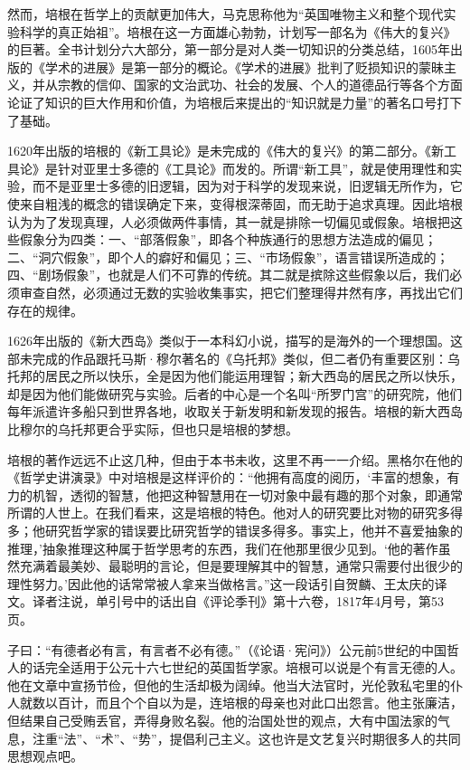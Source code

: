 \par 然而，培根在哲学上的贡献更加伟大，马克思称他为“英国唯物主义和整个现代实验科学的真正始祖”。培根在这一方面雄心勃勃，计划写一部名为《伟大的复兴》的巨著。全书计划分六大部分，第一部分是对人类一切知识的分类总结，1605年出版的《学术的进展》是第一部分的概论。《学术的进展》批判了贬损知识的蒙昧主义，并从宗教的信仰、国家的文治武功、社会的发展、个人的道德品行等各个方面论证了知识的巨大作用和价值，为培根后来提出的“知识就是力量”的著名口号打下了基础。
\par 1620年出版的培根的《新工具论》是未完成的《伟大的复兴》的第二部分。《新工具论》是针对亚里士多德的《工具论》而发的。所谓“新工具”，就是使用理性和实验，而不是亚里士多德的旧逻辑，因为对于科学的发现来说，旧逻辑无所作为，它使来自粗浅的概念的错误确定下来，变得根深蒂固，而无助于追求真理。因此培根认为为了发现真理，人必须做两件事情，其一就是排除一切偏见或假象。培根把这些假象分为四类：一、“部落假象”，即各个种族通行的思想方法造成的偏见；二、“洞穴假象”，即个人的癖好和偏见；三、“市场假象”，语言错误所造成的；四、“剧场假象”，也就是人们不可靠的传统。其二就是摈除这些假象以后，我们必须审查自然，必须通过无数的实验收集事实，把它们整理得井然有序，再找出它们存在的规律。
\par 1626年出版的《新大西岛》类似于一本科幻小说，描写的是海外的一个理想国。这部未完成的作品跟托马斯·穆尔著名的《乌托邦》类似，但二者仍有重要区别：乌托邦的居民之所以快乐，全是因为他们能运用理智；新大西岛的居民之所以快乐，却是因为他们能做研究与实验。后者的中心是一个名叫“所罗门宫”的研究院，他们每年派遣许多船只到世界各地，收取关于新发明和新发现的报告。培根的新大西岛比穆尔的乌托邦更合乎实际，但也只是培根的梦想。
\par 培根的著作远远不止这几种，但由于本书未收，这里不再一一介绍。黑格尔在他的《哲学史讲演录》中对培根是这样评价的：“他拥有高度的阅历，‘丰富的想象，有力的机智，透彻的智慧，他把这种智慧用在一切对象中最有趣的那个对象，即通常所谓的人世上。在我们看来，这是培根的特色。他对人的研究要比对物的研究多得多；他研究哲学家的错误要比研究哲学的错误多得多。事实上，他并不喜爱抽象的推理，’抽象推理这种属于哲学思考的东西，我们在他那里很少见到。‘他的著作虽然充满着最美妙、最聪明的言论，但是要理解其中的智慧，通常只需要付出很少的理性努力。’因此他的话常常被人拿来当做格言。”这一段话引自贺麟、王太庆的译文。译者注说，单引号中的话出自《评论季刊》第十六卷，1817年4月号，第53页。
\par 子曰：“有德者必有言，有言者不必有德。”（《论语·宪问》）公元前5世纪的中国哲人的话完全适用于公元十六七世纪的英国哲学家。培根可以说是个有言无德的人。他在文章中宣扬节俭，但他的生活却极为阔绰。他当大法官时，光伦敦私宅里的仆人就数以百计，而且个个自以为是，连培根的母亲也对此口出怨言。他主张廉洁，但结果自己受贿丢官，弄得身败名裂。他的治国处世的观点，大有中国法家的气息，注重“法”、“术”、“势”，提倡利己主义。这也许是文艺复兴时期很多人的共同思想观点吧。
